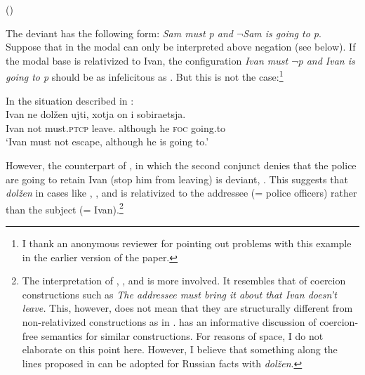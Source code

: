 \documentclass[output=paper,
modfonts,
newtxmath,colorlinks,citecolor=brown
]{langscibook}
\begin{document}
\ea \label{conjstr}  \label{conjstr-a}
	\label{conjstr-b}
     \hfill (\citealt[2]{nin05}) 
        \z \z

\noindent The deviant  has the following form: \textit{Sam must p and $\neg$Sam is going to p}. Suppose that in  the modal can only be interpreted above negation (see below). If the modal base is relativized to Ivan, the configuration \textit{Ivan must $\neg$p and Ivan is going to p} should be as infelicitous as . But this is not the case:\footnote{I thank an anonymous reviewer for pointing out problems with this example in the earlier version of the paper.
}

\ea In the situation described in : \\
	{\gll Ivan ne dolžen ujti, xotja on i sobiraetsja. \\
    Ivan not must.\textsc{ptcp} {leave.\p}  although he \textsc{foc}  going.to \\
    \glt `Ivan must not escape, although he is going to.'\label{conjivan}} 
	\z

\noindent However, the counterpart of , in which the second conjunct denies that the police are going to retain Ivan (stop him from leaving) is deviant, . This suggests that \textit{dolžen} in cases like    , , and  is relativized to the addressee (= police officers)  rather than the subject (= Ivan).\footnote{The interpretation of , , and  is more involved. It resembles that of coercion constructions such as \textit{The addressee must bring it about that Ivan doesn't leave.} This, however, does not mean that they are structurally different from non-relativized constructions as in . \cite{gra17} has an informative discussion of coercion-free semantics for similar constructions. For reasons of space, I do not elaborate on this point here. However, I believe that something along the lines proposed in \cite{gra17} can be adopted for Russian facts with \textit{dolžen}.     
}


       \z
\end{document}
